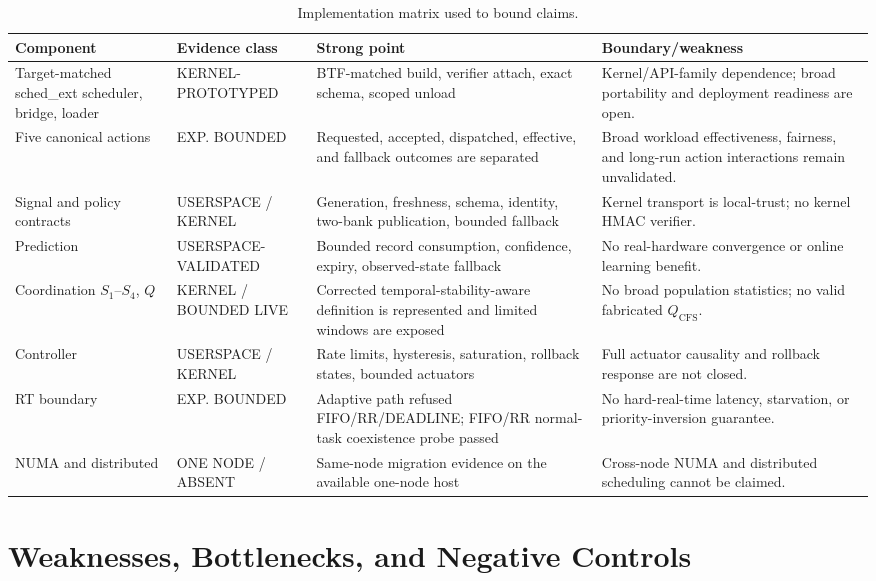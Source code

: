 \documentclass[10pt,letterpaper,twocolumn]{article}
\newcommand{\evidence}[1]{\textsf{\scriptsize #1}}
\begin{document}
\begin{table}[t]
\centering\scriptsize
\caption{Implementation matrix used to bound claims.}
\label{tab:maturity}
\begin{tabularx}{\textwidth}{p{}p{}p{}Y}
\toprule
Component & Evidence class & Strong point & Boundary/weakness \\
\midrule
Target-matched sched\_ext scheduler, bridge, loader & \evidence{KERNEL-PROTOTYPED} & BTF-matched build, verifier attach, exact schema, scoped unload & Kernel/API-family dependence; broad portability and deployment readiness are open. \\
Five canonical actions & \evidence{EXP. BOUNDED} & Requested, accepted, dispatched, effective, and fallback outcomes are separated & Broad workload effectiveness, fairness, and long-run action interactions remain unvalidated. \\
Signal and policy contracts & \evidence{USERSPACE / KERNEL} & Generation, freshness, schema, identity, two-bank publication, bounded fallback & Kernel transport is local-trust; no kernel HMAC verifier. \\
Prediction & \evidence{USERSPACE-VALIDATED} & Bounded record consumption, confidence, expiry, observed-state fallback & No real-hardware convergence or online learning benefit. \\
Coordination $S_1$--$S_4$, $Q$ & \evidence{KERNEL / BOUNDED LIVE} & Corrected temporal-stability-aware definition is represented and limited windows are exposed & No broad population statistics; no valid fabricated $Q_{\mathrm{CFS}}$. \\
Controller & \evidence{USERSPACE / KERNEL} & Rate limits, hysteresis, saturation, rollback states, bounded actuators & Full actuator causality and rollback response are not closed. \\
RT boundary & \evidence{EXP. BOUNDED} & Adaptive path refused FIFO/RR/DEADLINE; FIFO/RR normal-task coexistence probe passed & No hard-real-time latency, starvation, or priority-inversion guarantee. \\
NUMA and distributed & \evidence{ONE NODE / ABSENT} & Same-node migration evidence on the available one-node host & Cross-node NUMA and distributed scheduling cannot be claimed. \\
\bottomrule
\end{tabularx}
\end{table}

\section{Weaknesses, Bottlenecks, and Negative Controls}
\end{document}
